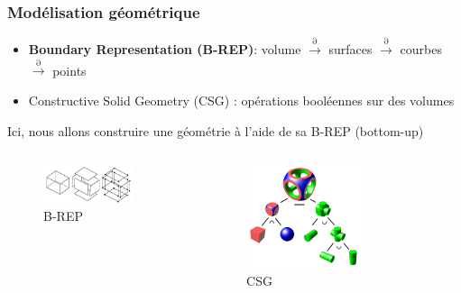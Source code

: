 \documentclass[aspectratio=169]{beamer}
\begin{document}
\begin{frame}[fragile]
\frametitle{Modélisation géométrique}
\footnotesize
  \begin{itemize}
    \item \textbf{Boundary Representation (B-REP)}: volume $\xrightarrow{\partial}$ surfaces $\xrightarrow{\partial}$ courbes $\xrightarrow{\partial}$ points
    \item Constructive Solid Geometry (CSG) : opérations booléennes sur des volumes
  \end{itemize}
  Ici, nous allons construire une géométrie à l'aide de sa B-REP (bottom-up)
  \begin{columns}
    \begin{column}{0.5\textwidth}
      \begin{figure}
        \includegraphics[width=0.8\textwidth]{figures/brep.png}
        \caption{B-REP \footnotemark[1]}
      \end{figure}
    \end{column}
    \begin{column}{0.5\textwidth}
      \begin{figure}
        \includegraphics[width=0.65\textwidth]{figures/csg.png}
        \caption{CSG \footnotemark[2]}
      \end{figure}
    \end{column}
  \end{columns}
  \vspace{-0.4cm}
\end{frame}
\end{document}
